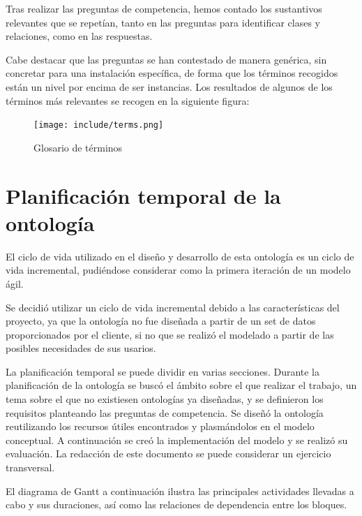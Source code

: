 \documentclass[a4paper,12pt]{article}
\begin{document}
	Tras realizar las preguntas de competencia, hemos contado los sustantivos relevantes que se repetían, tanto en las preguntas para identificar clases y relaciones, como en las respuestas. 
	
	Cabe destacar que las preguntas se han contestado de manera genérica, sin concretar para una instalación específica, de forma que los términos recogidos están un nivel por encima de ser instancias. Los resultados de algunos de los términos más relevantes se recogen en la siguiente figura: 

	\begin{figure}[H]
		\centering
		\texttt{[image: include/terms.png]}
		\caption{Glosario de términos}		
	\end{figure}
	
	\section{Planificación temporal de la ontología}
		
	El ciclo de vida utilizado en el diseño y desarrollo de esta ontología es un ciclo de vida incremental, pudiéndose considerar como la primera iteración de un modelo ágil.
	
	Se decidió utilizar un ciclo de vida incremental debido a las características del proyecto, ya que la ontología no fue diseñada a partir de un set de datos proporcionados por el cliente, si no que se realizó el modelado a partir de las posibles necesidades de sus usarios. 
	
	La planificación temporal se puede dividir en varias secciones. Durante la planificación de la ontología se buscó el ámbito sobre el que realizar el trabajo, un tema sobre el que no existiesen ontologías ya diseñadas, y se definieron los requisitos planteando las preguntas de competencia. Se diseñó la ontología reutilizando los recursos útiles encontrados y plasmándolos en el modelo conceptual. A continuación se creó la implementación del modelo y se realizó su evaluación. La redacción de este documento se puede considerar un ejercicio transversal.
	
	El diagrama de Gantt a continuación ilustra las principales actividades llevadas a cabo y sus duraciones, así como las relaciones de dependencia entre los bloques.
	
\end{document}
